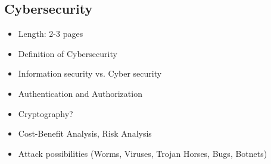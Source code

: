 \subsection{Cybersecurity}

\begin{itemize}
  \item Length: 2-3 pages
  \item Definition of Cybersecurity
  \item Information security vs. Cyber security
  \item Authentication and Authorization
  \item Cryptography?
  \item Cost-Benefit Analysis, Risk Analysis
  \item Attack possibilities (Worms, Viruses, Trojan Horses, Bugs, Botnets)
\end{itemize}
